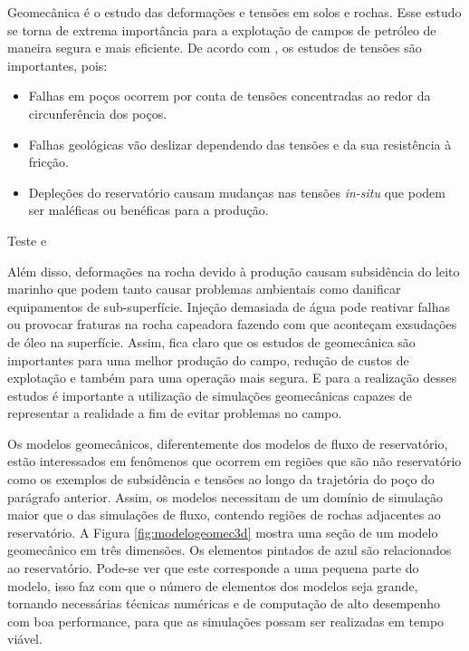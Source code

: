 

Geomecânica é o estudo das deformações e tensões em solos e rochas. Esse estudo se torna de extrema importância para a explotação de campos de petróleo de maneira segura e mais eficiente. De acordo com \citet{ResGeomec}, os estudos de tensões são importantes, pois:

\begin{itemize}
    \item Falhas em poços ocorrem por conta de tensões concentradas ao redor da circunferência dos poços.
    \item Falhas geológicas vão deslizar dependendo das tensões e da sua resistência à fricção. 
    \item Depleções do reservatório causam mudanças nas tensões \textit{in-situ} que podem ser maléficas ou benéficas para a produção.
\end{itemize}

Teste \citet{tesemateus} e \citet{ilas}

Além disso, deformações na rocha devido à produção causam subsidência do leito marinho que podem tanto causar problemas ambientais como danificar equipamentos de sub-superfície. Injeção demasiada de água  pode reativar falhas ou provocar fraturas na rocha capeadora fazendo com que aconteçam exsudações de óleo na superfície. Assim, fica claro que os estudos de geomecânica são importantes para uma melhor produção do campo, redução de custos de explotação e também para uma operação mais segura.  E para a realização desses estudos é importante a utilização de simulações geomecânicas capazes de representar a realidade a fim de evitar problemas no campo.

Os modelos geomecânicos, diferentemente dos modelos de fluxo de reservatório, estão interessados em fenômenos que ocorrem em regiões que são não reservatório como os exemplos de subsidência e tensões ao longo da trajetória do poço do parágrafo anterior. Assim, os modelos necessitam de um domínio de simulação maior que o das simulações de fluxo, contendo regiões de rochas adjacentes ao reservatório. A Figura \ref{fig:modelogeomec3d} mostra uma seção de um modelo geomecânico em três dimensões. Os elementos pintados de azul são relacionados ao reservatório. Pode-se ver que este corresponde a uma pequena parte do modelo, isso faz com que o número de elementos dos  modelos seja grande, tornando necessárias técnicas numéricas e de computação de alto desempenho com boa performance, para que as simulações possam ser realizadas em tempo viável. 



